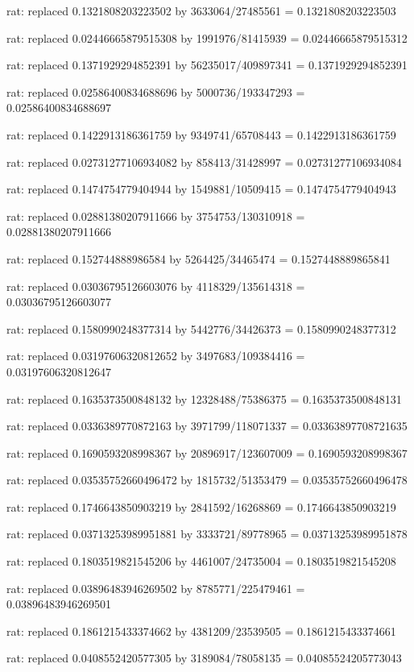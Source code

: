 \documentclass[a4paper,10pt]{article}
\begin{document}
\begin{eulernotebook}
\begin{eulercomment}
\begin{eulercomment}
\begin{eulercomment}
\begin{eulercomment}
\begin{eulercomment}
\begin{eulercomment}
\begin{eulercomment}
\begin{eulercomment}
\begin{eulercomment}
\begin{eulercomment}
\begin{eulercomment}
\begin{eulercomment}
\begin{eulercomment}
\begin{eulercomment}
\begin{eulercomment}
\begin{eulercomment}
\begin{euleroutput}
  rat: replaced 0.1321808203223502 by 3633064/27485561 = 0.1321808203223503
  
  rat: replaced 0.02446665879515308 by 1991976/81415939 = 0.02446665879515312
  
  rat: replaced 0.1371929294852391 by 56235017/409897341 = 0.1371929294852391
  
  rat: replaced 0.02586400834688696 by 5000736/193347293 = 0.02586400834688697
  
  rat: replaced 0.1422913186361759 by 9349741/65708443 = 0.1422913186361759
  
  rat: replaced 0.02731277106934082 by 858413/31428997 = 0.02731277106934084
  
  rat: replaced 0.1474754779404944 by 1549881/10509415 = 0.1474754779404943
  
  rat: replaced 0.02881380207911666 by 3754753/130310918 = 0.02881380207911666
  
  rat: replaced 0.152744888986584 by 5264425/34465474 = 0.1527448889865841
  
  rat: replaced 0.03036795126603076 by 4118329/135614318 = 0.03036795126603077
  
  rat: replaced 0.1580990248377314 by 5442776/34426373 = 0.1580990248377312
  
  rat: replaced 0.03197606320812652 by 3497683/109384416 = 0.03197606320812647
  
  rat: replaced 0.1635373500848132 by 12328488/75386375 = 0.1635373500848131
  
  rat: replaced 0.0336389770872163 by 3971799/118071337 = 0.03363897708721635
  
  rat: replaced 0.1690593208998367 by 20896917/123607009 = 0.1690593208998367
  
  rat: replaced 0.03535752660496472 by 1815732/51353479 = 0.03535752660496478
  
  rat: replaced 0.1746643850903219 by 2841592/16268869 = 0.1746643850903219
  
  rat: replaced 0.03713253989951881 by 3333721/89778965 = 0.03713253989951878
  
  rat: replaced 0.1803519821545206 by 4461007/24735004 = 0.1803519821545208
  
  rat: replaced 0.03896483946269502 by 8785771/225479461 = 0.03896483946269501
  
  rat: replaced 0.1861215433374662 by 4381209/23539505 = 0.1861215433374661
  
  rat: replaced 0.0408552420577305 by 3189084/78058135 = 0.04085524205773043
  

\end{euleroutput}
\end{eulercomment}
\end{eulercomment}
\end{eulercomment}
\end{eulercomment}
\end{eulercomment}
\end{eulercomment}
\end{eulercomment}
\end{eulercomment}
\end{eulercomment}
\end{eulercomment}
\end{eulercomment}
\end{eulercomment}
\end{eulercomment}
\end{eulercomment}
\end{eulercomment}
\end{eulercomment}
\end{eulernotebook}
\end{document}
